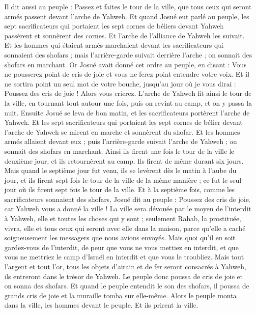 \begin{multicols}{2}
Il dit aussi au peuple : Passez et faites le tour de la ville, que tous ceux qui seront armés passent devant l'arche de Yahweh.
Et quand Josué eut parlé au peuple, les sept sacrificateurs qui portaient les sept cornes de béliers devant Yahweh passèrent et sonnèrent des cornes. Et l'arche de l'alliance de Yahweh les suivait.
Et les hommes qui étaient armés marchaient devant les sacrificateurs qui sonnaient des shofars ; mais l'arrière-garde suivait derrière l'arche ; on sonnait des shofars en marchant.
Or Josué avait donné cet ordre au peuple, en disant : Vous ne pousserez point de cris de joie et vous ne ferez point entendre votre voix. Et il ne sortira point un seul mot de votre bouche, jusqu'au jour où je vous dirai : Poussez des cris de joie ! Alors vous crierez.
L'arche de Yahweh fit ainsi le tour de la ville, en tournant tout autour une fois, puis on revint au camp, et on y passa la nuit.
Ensuite Josué se leva de bon matin, et les sacrificateurs portèrent l'arche de Yahweh.
Et les sept sacrificateurs qui portaient les sept cornes de bélier devant l'arche de Yahweh se mirent en marche et sonnèrent du shofar. Et les hommes armés allaient devant eux ; puis l'arrière-garde suivait l'arche de Yahweh ; on sonnait des shofars en marchant.
Ainsi ils firent une fois le tour de la ville le deuxième jour, et ils retournèrent au camp. Ils firent de même durant six jours.
Mais quand le septième jour fut venu, ils se levèrent dès le matin à l'aube du jour, et ils firent sept fois le tour de la ville de la même manière ; ce fut le seul jour où ils firent sept fois le tour de la ville.
Et à la septième fois, comme les sacrificateurs sonnaient des shofars, Josué dit au peuple : Poussez des cris de joie, car Yahweh vous a donné la ville !
La ville sera dévouée par le moyen de l'interdit à Yahweh, elle et toutes les choses qui y sont ; seulement Rahab, la prostituée, vivra, elle et tous ceux qui seront avec elle dans la maison, parce qu'elle a caché soigneusement les messagers que nous avions envoyés.
Mais quoi qu'il en soit gardez-vous de l'interdit, de peur que vous ne vous mettiez en interdit, et que vous ne mettriez le camp d'Israël en interdit et que vous le troubliez.
Mais tout l'argent et tout l'or, tous les objets d'airain et de fer seront consacrés à Yahweh, ils entreront dans le trésor de Yahweh.
Le peuple donc poussa de cris de joie et on sonna des shofars. Et quand le peuple entendit le son des shofars, il poussa de grands cris de joie et la muraille tomba sur elle-même. Alors le peuple monta dans la ville, les hommes devant le peuple. Et ils prirent la ville. 

\end{multicols}
